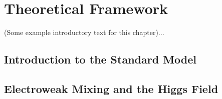 \chapter[Theoretical Framework][Theoretical Framework]{Theoretical Framework} \label{ch:theory}

(Some example introductory text for this chapter)...

\section{Introduction to the Standard Model} \label{sec:sm}


\section{Electroweak Mixing and the Higgs Field} \label{sec:higgsIntro}


